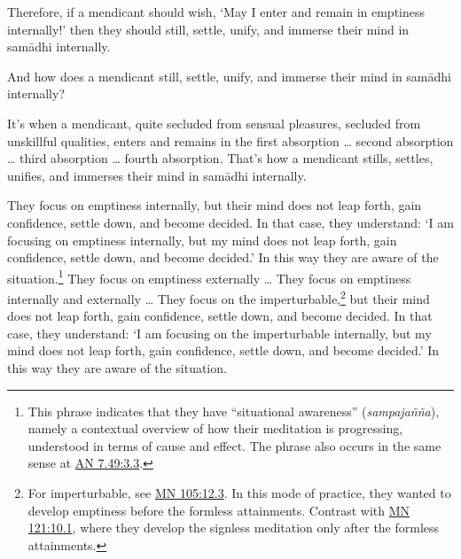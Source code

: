 \documentclass[12pt,openany]{book}%
\begin{document}
Therefore, if a mendicant should wish, ‘May I enter and remain in emptiness internally!’ then they should still, settle, unify, and immerse their mind in \textsanskrit{samādhi} internally. 

And how does a mendicant still, settle, unify, and immerse their mind in \textsanskrit{samādhi} internally? 

It’s when a mendicant, quite secluded from sensual pleasures, secluded from unskillful qualities, enters and remains in the first absorption … second absorption … third absorption … fourth absorption. That’s how a mendicant stills, settles, unifies, and immerses their mind in \textsanskrit{samādhi} internally. 

They focus on emptiness internally, but their mind does not leap forth, gain confidence, settle down, and become decided. In that case, they understand: ‘I am focusing on emptiness internally, but my mind does not leap forth, gain confidence, settle down, and become decided.’ In this way they are aware of the situation.\footnote{This phrase indicates that they have “situational awareness” (\textit{\textsanskrit{sampajañña}}), namely a contextual overview of how their meditation is progressing, understood in terms of cause and effect. The phrase also occurs in the same sense at \href{https://suttacentral.net/an7.49/en/sujato\#3.3}{AN 7.49:3.3}. } They focus on emptiness externally … They focus on emptiness internally and externally … They focus on the imperturbable,\footnote{For imperturbable, see \href{https://suttacentral.net/mn105/en/sujato\#12.3}{MN 105:12.3}. In this mode of practice, they wanted to develop emptiness before the formless attainments. Contrast with \href{https://suttacentral.net/mn121/en/sujato\#10.1}{MN 121:10.1}, where they develop the signless meditation only after the formless attainments. } but their mind does not leap forth, gain confidence, settle down, and become decided. In that case, they understand: ‘I am focusing on the imperturbable internally, but my mind does not leap forth, gain confidence, settle down, and become decided.’ In this way they are aware of the situation. 
\end{document}
